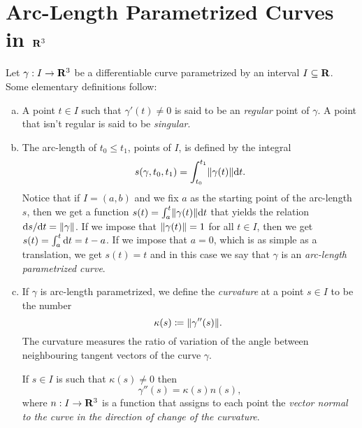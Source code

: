 \section{Arc-Length Parametrized Curves in \texorpdfstring{\(\mathbf{R}^3\)}{R3}}

\begin{definition}\label{def:curve-r}
    Let \(\gamma: I \to \mathbf{R}^3\) be a differentiable curve parametrized by an interval \(I \subseteq \mathbf{R}\).
    Some elementary definitions follow:
    \begin{enumerate}[(a)]\setlength\itemsep{0em}
        \item A point \(t \in I\) such that \(\gamma'(t) \neq 0\) is said to be an \emph{regular}
            point of \(\gamma\). A point that isn't regular is said to be \emph{singular}.

        \item The arc-length of \(t_0 \leq t_1\), points of \(I\), is defined by the integral
            \[
                s(\gamma, t_0, t_1) = \int_{t_0}^{t_1} \lVert\gamma(t)\rVert \mathrm{d} t.
            \]
            Notice that if \(I = (a, b)\) and we fix \(a\) as the starting point of the arc-length
            \(s\), then we get a function \(s(t) = \int_a^t \lVert\gamma(t)\rVert \mathrm{d} t\) that yields
            the relation \(\mathrm{d} s / \mathrm{d} t = \lVert\gamma\rVert\). If we impose that \(\lVert\gamma(t)\rVert
            = 1\) for all \(t \in I\), then we get \(s(t) = \int_a^t \mathrm{d} t = t - a\). If we impose
            that \(a = 0\), which is as simple as a translation, we get \(s(t) = t\) and in this
            case we say that \(\gamma\) is an \emph{arc-length parametrized curve}.

        \item If \(\gamma\) is arc-length parametrized, we define the \emph{curvature} at a point
            \(s \in I\) to be the number 
            \[
                \kappa(s) \coloneq \lVert\gamma''(s)\rVert.\
            \] 
            The curvature measures the ratio of variation of the angle between neighbouring tangent
            vectors of the curve \(\gamma\).

            If \(s \in I\) is such that \(\kappa(s) \neq 0\) then 
            \[
                \gamma''(s) = \kappa(s) n(s),
            \]
            where \(n: I \to \mathbf{R}^3\) is a function that assigns to each point the \emph{vector normal
            to the curve in the direction of change of the curvature}.


\end{enumerate}
\end{definition}
